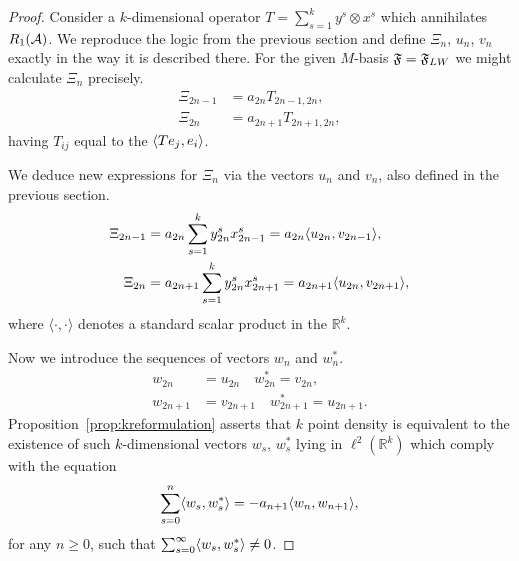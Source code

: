  \begin{proof}
    Consider a $k$-dimensional operator $T = \sum_{s=1}^k y^s \otimes x^s$ which annihilates $R_1(\cal{A})$.
    We reproduce the logic from the previous section and define $\Xi_n$, $u_n$, $v_n$ exactly in the way it is described there.
    For the given $M$-basis $\fsys = \fsys_{LW}$ we might calculate $\Xi_n$ precisely.
    \begin{align*}
      \Xi_{2n-1} &= a_{2n}T_{2n - 1, 2n},\\
      \Xi_{2n} &= a_{2n + 1}T_{2n + 1, 2n},
    \end{align*}
      having $T_{ij}$ equal to the $\inner{Te_j}{e_i}$.

    We deduce new expressions for $\Xi_n$ via the vectors $u_n$ and $v_n$,
      also defined in the previous section.
    \begin{equation}
      \begin{aligned}
        \Xi_{2n-1} &= a_{2n} \sum_{s=1}^k y^s_{2n} x^s_{2n-1} = a_{2n} \inner{u_{2n}}{v_{2n-1}},\\
        \Xi_{2n} &= a_{2n+1} \sum_{s=1}^k y^s_{2n} x^s_{2n+1} = a_{2n+1} \inner{u_{2n}}{v_{2n+1}},
      \end{aligned}
    \end{equation}
      where $\langle\cdot, \cdot\rangle$ denotes a standard scalar product in the $\mathbb{R}^k$.

    Now we introduce the sequences of vectors $w_n$ and $w^*_n$.
    \begin{align*}
      w_{2n} &= u_{2n} \quad w^*_{2n} = v_{2n},\\
      w_{2n+1} &= v_{2n+1} \quad w^*_{2n+1} = u_{2n+1}.
    \end{align*}
    Proposition~\ref{prop:kreformulation} asserts that $k$ point density is equivalent to the existence of
      such $k$-dimensional vectors $w_s$, $w^*_s$ lying in $\ell^2(\mathbb{R}^k)$ which comply with the equation
    \begin{equation}
      \label{eq:vector2}
      \sum_{s=0}^n \inner{w_s}{w^*_s} = -a_{n+1} \inner{w_n}{w_{n+1}},
    \end{equation}
      for any $n \geq 0$, such that $\sum_{s=0}^\infty \inner{w_s}{w^*_s} \neq 0$.


\end{proof}
